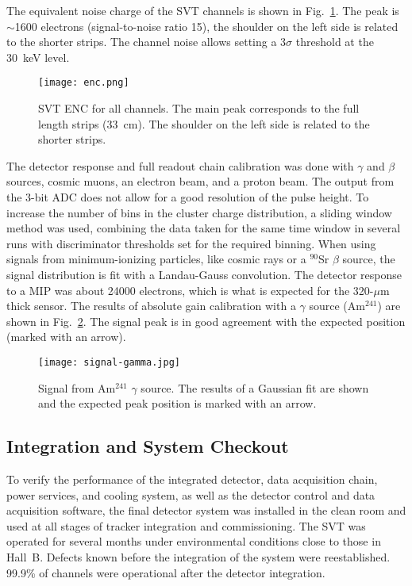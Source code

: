 The equivalent noise charge of the SVT channels is shown in  Fig.~\ref{fig:enc}. The peak is $\sim$1600 electrons
(signal-to-noise ratio 15), the shoulder on the left side is related to the shorter strips. The channel noise allows
setting a 3$\sigma$ threshold at the 30~keV level. 

\begin{figure}[hbt] 
	\centering 
	\texttt{[image: enc.png]}
	\caption{SVT ENC for all channels. The main peak corresponds to the full length strips (33~cm). The shoulder
          on the left side is related to the shorter strips.}
	\label{fig:enc}
\end{figure}

The detector response and full readout chain calibration was done with $\gamma$ and $\beta$ sources, cosmic
muons, an electron beam, and a proton beam. The output from the 3-bit ADC does not allow for a good resolution
of the pulse height. To increase the number of bins in the cluster charge distribution, a sliding window method was
used, combining the data taken for the same time window in several runs with discriminator thresholds set for the
required binning. When using signals from minimum-ionizing particles, like cosmic rays or a $^{90}$Sr $\beta$
source, the signal distribution is fit with a Landau-Gauss convolution. The detector response to a MIP was about
24000 electrons, which is what is expected for the 320-$\mu$m thick sensor. The results of absolute gain
calibration with a $\gamma$ source (Am$^{241}$) are shown in Fig.~\ref{fig:signal-gamma}. The signal peak is in
good agreement with the expected position (marked with an arrow). 

\begin{figure}[hbt] 
	\centering 
	\texttt{[image: signal-gamma.jpg]}
	\caption{Signal from Am$^{241}$ $\gamma$ source. The results of a Gaussian fit are shown and the
          expected peak position is marked with an arrow.}
	\label{fig:signal-gamma}
\end{figure}

\subsection{Integration and System Checkout}

To verify the performance of the integrated detector, data acquisition chain, power services, and cooling system, as
well as the detector control and data acquisition software, the final detector system was installed in the clean room
and used at all stages of tracker integration and commissioning. The SVT was operated for several months under
environmental conditions close to those in Hall~B. Defects known before the integration of the system were
reestablished. 99.9\% of channels were operational after the detector integration. 
 
